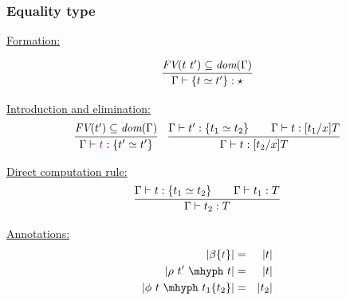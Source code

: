 \documentclass[11pt]{beamer}
\begin{document}
\begin{frame}
  \frametitle{Equality type}

  \underline{Formation:}

  \[
  \infer{\Gamma \vdash \{ t \simeq t' \} : \star}{\textit{FV}(t\ t')\subseteq\textit{dom}(\Gamma)}
  \]

  \underline{Introduction and elimination:}
  \[
  \begin{array}{ll}
    \infer{\Gamma\vdash \textcolor{purple}{t} : \{ t' \simeq t'\}}{\textit{FV}(t')\subseteq\textit{dom}(\Gamma)}
    &
    \infer{\Gamma\vdash t : [t_2/x]T}{\Gamma\vdash t' : \{ t_1\simeq t_2\} \qquad \Gamma\vdash t : [t_1/x]T}
  \end{array}
  \]

\vspace{.1cm}

  \underline{Direct computation rule:}
  \[
  \infer{\Gamma\vdash t_2 : T}{\Gamma\vdash t : \{ t_1 \simeq t_2\} \qquad \Gamma\vdash t_1 : T}
  \]

  \underline{Annotations:}
  \begin{eqnarray*}
    |\beta\{\textcolor{purple}{t}\}| & = & |t| \\
    |\rho\ t'\ \mhyph\ t| & = & |t| \\
    |\phi\ t\ \mhyph\ t_1\{t_2\}| & = & |t_2|
  \end{eqnarray*}


\vspace{-4.5cm}

\pause
\hspace{2.2cm}  

\vspace{4.5cm}
\end{frame}  
\end{document}
